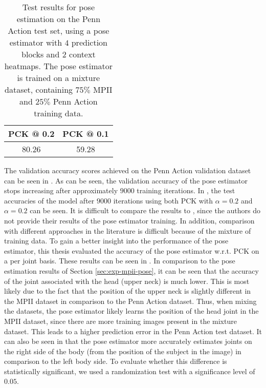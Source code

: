 \begin{table}[]
    \small
    \centering
    \begin{tabular}{|c|c|}
    \hline
        \textbf{PCK @ 0.2} & \textbf{PCK @ 0.1} \\ \hline
        80.26 & 59.28 \\ \hline
    \end{tabular}
    \caption{Test results for pose estimation on the Penn Action test set, using a pose estimator with $4$ prediction blocks and $2$ context heatmaps. The pose estimator is trained on a mixture dataset, containing $75\%$ MPII and $25\%$ Penn Action training data.}
    \label{tab:pose-mixed-quantitative-results}
\end{table}

The validation accuracy scores achieved on the Penn Action validation dataset can be seen in .
As can be seen, the validation accuracy of the pose estimator stops increasing after approximately $9000$ training iterations.
In , the test accuracies of the model after $9000$ iterations using both PCK with $\alpha = 0.2$ and $\alpha = 0.2$ can be seen.
It is difficult to compare the results to \cite{luvizon_2d/3d_2018}, since the authors do not provide their results of the pose estimator training.
In addition, comparison with different approaches in the literature is difficult because of the mixture of training data.
To gain a better insight into the performance of the pose estimator, this thesis evaluated the accuracy of the pose estimator w.r.t. PCK on a per joint basis.
These results can be seen in .
In comparison to the pose estimation results of Section \ref{sec:exp-mpii-pose}, it can be seen that the accuracy of the joint associated with the head (upper neck) is much lower.
This is most likely due to the fact that the position of the upper neck is slightly different in the MPII dataset in comparison to the Penn Action dataset.
Thus, when mixing the datasets, the pose estimator likely learns the position of the head joint in the MPII dataset, since there are more training images present in the mixture dataset.
This leads to a higher prediction error in the Penn Action test dataset.
It can also be seen in  that the pose estimator more accurately estimates joints on the right side of the body (from the position of the subject in the image) in comparison to the left body side.
To evaluate whether this difference is statistically significant, we used a randomization test with a significance level of $0.05$.

